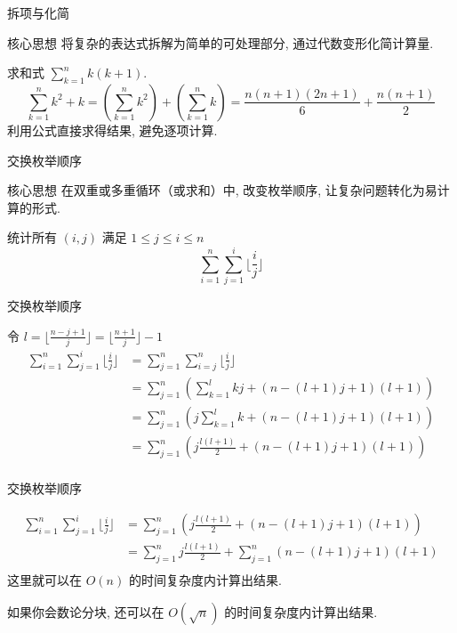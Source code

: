 \documentclass[aspectratio=169]{beamer}  %
\newcommand{\pau}{\pause}
\begin{document}
\begin{frame}{拆项与化简}
\begin{block}{核心思想}
将复杂的表达式拆解为简单的可处理部分, 通过代数变形化简计算量. 
\end{block}
\pau
\begin{example}
求和式 $\displaystyle \sum_{k=1}^n k(k+1)$. \pau
\[
\sum_{k=1}^n k^2 + k
= \left(\sum_{k=1}^n k^2\right) + \left(\sum_{k=1}^n k\right)
= \frac{n(n+1)(2n+1)}{6} + \frac{n(n+1)}{2}
\]
利用公式直接求得结果, 避免逐项计算.
\end{example}
\end{frame}

\begin{frame}{交换枚举顺序}
\begin{block}{核心思想}
在双重或多重循环（或求和）中, 改变枚举顺序, 让复杂问题转化为易计算的形式. 
\end{block}
\pau

\begin{example}
统计所有 $(i,j)$ 满足 $1 \le j \le i \le n$
$$\sum_{i=1}^n \sum_{j=1}^i \lfloor \frac{i}{j} \rfloor$$
\end{example}
\end{frame}

\begin{frame}{交换枚举顺序}
\begin{solution}
令 $l = \lfloor \frac{n - j + 1}{j} \rfloor = \lfloor \frac{n + 1}{j} \rfloor - 1$
\begin{align*}
\sum_{i=1}^n \sum_{j=1}^i \lfloor \frac{i}{j} \rfloor
&= \sum_{j=1}^n \sum_{i=j}^n \lfloor \frac{i}{j} \rfloor\\
&= \sum_{j=1}^n \left(\sum_{k=1}^{l} kj + (n - (l + 1)j + 1)(l + 1)\right)\\
&= \sum_{j=1}^n \left(j \sum_{k=1}^{l} k + (n - (l + 1)j + 1)(l + 1)\right)\\
&= \sum_{j=1}^n \left(j \frac{l(l + 1)}{2} + (n - (l + 1)j + 1)(l + 1)\right)\\
\end{align*}
\end{solution}
\end{frame}

\begin{frame}{交换枚举顺序}
\begin{solution}
\begin{align*}
\sum_{i=1}^n \sum_{j=1}^i \lfloor \frac{i}{j} \rfloor
&= \sum_{j=1}^n \left(j \frac{l(l + 1)}{2} + (n - (l + 1)j + 1)(l + 1)\right)\\
&= \sum_{j=1}^n j \frac{l(l + 1)}{2} + \sum_{j=1}^n(n - (l + 1)j + 1)(l + 1) \\
\end{align*}
这里就可以在 $O(n)$ 的时间复杂度内计算出结果.

\vspace{1em}

如果你会数论分块, 还可以在 $O(\sqrt{n})$ 的时间复杂度内计算出结果.
\end{solution}
\end{frame}
\end{document}
